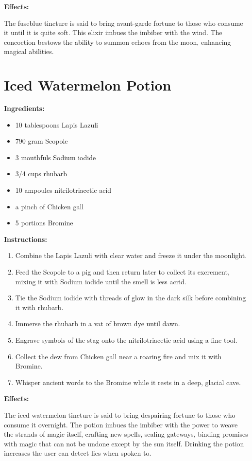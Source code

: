 \documentclass{article}
\begin{document}
\textbf{Effects:}

The fuseblue tincture is said to bring avant-garde fortune to those who consume it until it is quite soft. This elixir imbues the imbiber with the wind. The concoction bestows the ability to summon echoes from the moon, enhancing magical abilities.

\newpage
\section*{Iced Watermelon Potion}

\textbf{Ingredients:}

\begin{itemize}
  \item 10 tablespoons Lapis Lazuli
  \item 790 gram Scopole
  \item 3 mouthfuls Sodium iodide
  \item 3/4 cups rhubarb
  \item 10 ampoules nitrilotriacetic acid
  \item a pinch of Chicken gall
  \item 5 portions Bromine
\end{itemize}

\textbf{Instructions:}

\begin{enumerate}
  \item Combine the Lapis Lazuli with clear water and freeze it under the moonlight.
  \item Feed the Scopole to a pig and then return later to collect its excrement, mixing it with Sodium iodide until the smell is less acrid.
  \item Tie the Sodium iodide with threads of glow in the dark silk before combining it with rhubarb.
  \item Immerse the rhubarb in a vat of brown dye until dawn.
  \item Engrave symbols of the stag onto the nitrilotriacetic acid using a fine tool.
  \item Collect the dew from Chicken gall near a roaring fire and mix it with Bromine.
  \item Whisper ancient words to the Bromine while it rests in a deep, glacial cave.
\end{enumerate}

\textbf{Effects:}

The iced watermelon tincture is said to bring despairing fortune to those who consume it overnight. The potion imbues the imbiber with the power to weave the strands of magic itself, crafting new spells, sealing gateways, binding promises with magic that can not be undone except by the sun itself. Drinking the potion increases the user can detect lies when spoken to.
\end{document}
